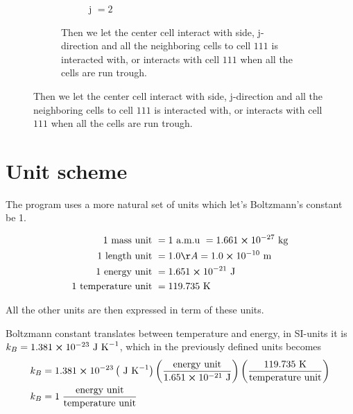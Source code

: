 \documentclass[11pt]{article}
\begin{document}
\begin{figure}
\begin{subfigure}{1\textwidth}
\begin{subfigure}[b]{0.18\textwidth}
	        \caption*{j \(= 2\)}
	        \end{subfigure}
	       	\caption{Then we let the center cell interact with side, j-direction and all the neighboring cells to cell \(111\) is interacted with, or interacts with cell \(111\) when all the cells are run trough.}
	       	\label{fig:side}
		\end{subfigure}
	\end{figure}
		

	\appendix
	\section{Unit scheme}
		The program uses a more natural set of units which let's Boltzmann's constant be 1.

		\begin{align}
			1 \text{ mass unit } &= 1 \text{ a.m.u } = 1.661\cross 10^{-27} \text{ kg}
			\\
			1 \text{ length unit } &= 1.0 Å = 1.0\cross 10^{-10} \text{ m}
			\\
			1 \text{ energy unit } &= 1.651 \cross 10^{-21} \text{ J}
			\\
			1 \text{ temperature unit } &= 119.735 \text{ K}
		\end{align}


	All the other units are then expressed in term of these units.

	Boltzmann constant translates between temperature and energy, in SI-units it is \( k_B = 1.381 \cross 10^{-23} \text{ J K}^{-1}\), which in the previously defined units becomes
	\begin{align}
	k_B &= 1.381 \cross 10^{-23}  \left(\text{ J K}^{-1}\right)  \left(\frac{\text{energy unit}}{1.651 \cross 10^{-21} \text{ J}}\right)
	\left( \frac{119.735 \text{ K}}{\text{temperature unit}} \right)
	\\
	k_B &= 1 \; \frac{\text{energy unit}}{\text{temperature unit}}
	\end{align}





{}

		
\end{document}
